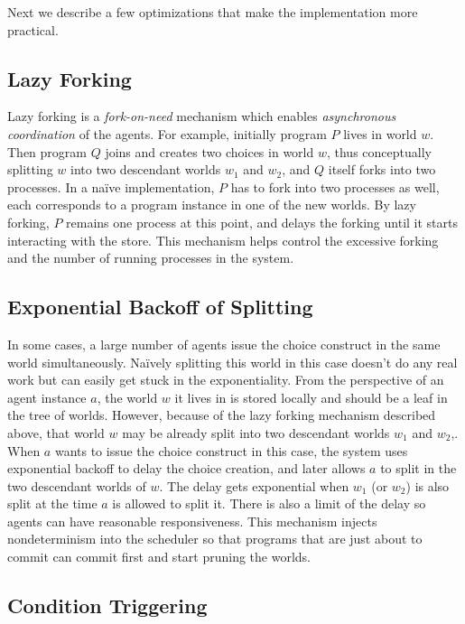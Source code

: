 Next we describe a few optimizations that make the implementation more practical.

\subsection*{Lazy Forking}

Lazy forking is a \emph{fork-on-need} mechanism which enables 
\emph{asynchronous coordination} of the agents.
For example, initially program $P$ lives in world $w$. 
Then program $Q$ joins and creates two choices in world $w$, 
thus conceptually splitting $w$ into two descendant worlds $w_1$ and $w_2$,
and $Q$ itself forks into two processes.
In a na\"ive implementation, $P$ has to fork into two processes as well,
each corresponds to a program instance in one of the new worlds.
By lazy forking, $P$ remains one process at this point, 
and delays the forking until it starts interacting with the store.
This mechanism helps control the excessive forking and the number of
running processes in the system.

\subsection*{Exponential Backoff of Splitting}

In some cases, a large number of agents issue the choice construct 
in the same world simultaneously. Na\"ively splitting this world 
in this case doesn't do any real work but can easily get stuck in 
the exponentiality. 
From the perspective of an agent instance $a$, the world $w$ it lives in 
is stored locally and should be a leaf in the tree of worlds. 
However, because of the lazy forking mechanism described above,
that world $w$ may be already split into two descendant worlds $w_1$ and $w_2$,. 
When $a$ wants to issue the choice construct in this case, 
the system uses exponential backoff to delay the choice creation,
and later allows $a$ to split in the two descendant worlds of $w$.
The delay gets exponential when $w_1$ (or $w_2$) is also split 
at the time $a$ is allowed to split it. 
There is also a limit of the delay so agents can have reasonable responsiveness. 
This mechanism injects nondeterminism into the scheduler so that programs that are just
about to commit can commit first and start pruning the worlds.

\subsection*{Condition Triggering}

